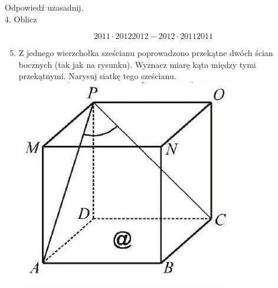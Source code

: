 \documentclass[10pt]{article}
\begin{document}
Odpowiedź uzasadnij.\\
4. Oblicz

\[
2011 \cdot 20122012-2012 \cdot 20112011
\]

\begin{enumerate}
  \setcounter{enumi}{4}
  \item Z jednego wierzchołka sześcianu poprowadzono przekątne dwóch ścian bocznych (tak jak na rysunku). Wyznacz miarę kąta między tymi przekątnymi. Narysuj siatkę tego sześcianu.\\
\includegraphics[max width=\textwidth, center]{2024_11_21_6999515b00f050cfcacag-1(1)}
\end{enumerate}
\end{document}
